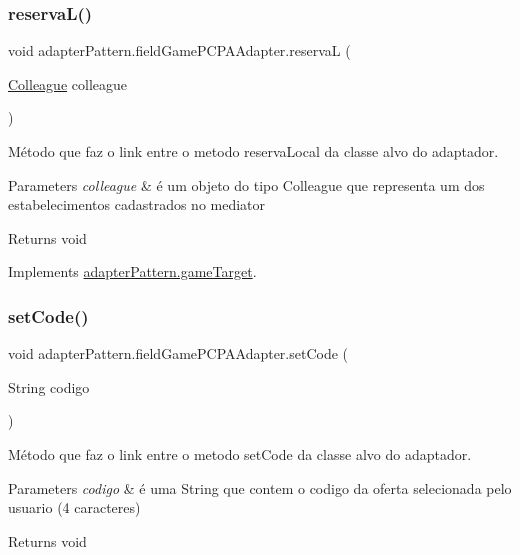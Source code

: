 \subsubsection{\texorpdfstring{reservaL()}{reservaL()}}
{\footnotesize\ttfamily void adapter\+Pattern.\+field\+Game\+P\+C\+P\+A\+Adapter.\+reservaL (\begin{DoxyParamCaption}\item[{\mbox{\hyperlink{classmediator_pattern_1_1_colleague}{Colleague}}}]{colleague }\end{DoxyParamCaption})}



Método que faz o link entre o metodo reserva\+Local da classe alvo do adaptador. 


\begin{DoxyParams}{Parameters}
{\em colleague} & é um objeto do tipo Colleague que representa um dos estabelecimentos cadastrados no mediator \\
\hline
\end{DoxyParams}
\begin{DoxyReturn}{Returns}
void 
\end{DoxyReturn}


Implements \mbox{\hyperlink{interfaceadapter_pattern_1_1game_target_a663405a3d10988de25c6ea3ef63c68eb}{adapter\+Pattern.\+game\+Target}}.

\mbox{\label{classadapter_pattern_1_1field_game_p_c_p_a_adapter_a94225ddf64c2d6a84d7ab6d8d2918d8c}} 
\subsubsection{\texorpdfstring{setCode()}{setCode()}}
{\footnotesize\ttfamily void adapter\+Pattern.\+field\+Game\+P\+C\+P\+A\+Adapter.\+set\+Code (\begin{DoxyParamCaption}\item[{String}]{codigo }\end{DoxyParamCaption})}



Método que faz o link entre o metodo set\+Code da classe alvo do adaptador. 


\begin{DoxyParams}{Parameters}
{\em codigo} & é uma String que contem o codigo da oferta selecionada pelo usuario (4 caracteres) \\
\hline
\end{DoxyParams}
\begin{DoxyReturn}{Returns}
void 
\end{DoxyReturn}


